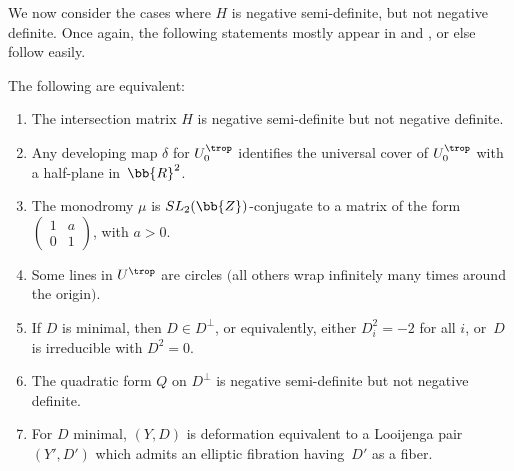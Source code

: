 We now consider the cases where $H$ is negative semi-definite, but not negative definite. Once again, the following statements mostly appear in \cite{GHK1} and \cite{GHK2}, or else follow easily.
\begin{thm}\label{The strictly negative semi-definite case}\label{NegSD}
The following are equivalent:
\begin{enumerate}\itemsep=0pt
\item[$1.$] The {intersection matrix} $H$ is negative semi-definite but not negative definite.
\item[$2.$] Any {developing map} $\delta$ for $U^{\trop}_0$ identifies the universal cover of $U^{\trop}_0$ with a half-plane in~$\bb{R}^2$.
\item[$3.$] The monodromy $\mu$ is $SL_2(\bb{Z})$-conjugate to a matrix of the form
	$\left(\begin{smallmatrix}
		1 &a \\
		0 &1
		\end{smallmatrix}\right)$,
		 with $a > 0$.
\item[$4.$] Some {lines} in $U^{\trop}$ are circles $($all others wrap infinitely many times around the origin$)$.
\item[$5.$] If $D$ is minimal, then $D \in D^{\perp}$, or equivalently, either $D_i^2 = -2$ for all $i$, or~$D$ is irreducible with $D^2=0$.
\item[$6.$] The {quadratic form} $Q$ on $D^{\perp}$ is negative semi-definite but not negative definite.
\item[$7.$] For $D$ minimal, $(Y,D)$ is deformation equivalent to a Looijenga pair $(Y',D')$ which admits an elliptic fibration having~$D'$ as a fiber.
\end{enumerate}
\end{thm}
